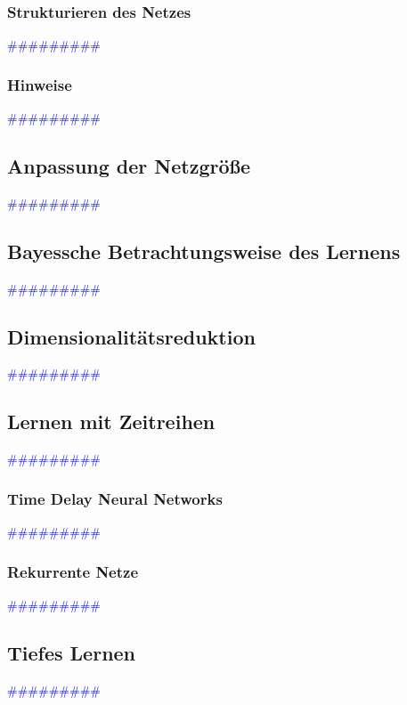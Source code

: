 \documentclass{article}
\begin{document}
    \subsubsection{Strukturieren des Netzes} %
      \textcolor{blue}{\#\#\#\#\#\#\#\#\#}
    \subsubsection{Hinweise} %
      \textcolor{blue}{\#\#\#\#\#\#\#\#\#}
  \subsection{Anpassung der Netzgröße} %
      \textcolor{blue}{\#\#\#\#\#\#\#\#\#}
  \subsection{Bayessche Betrachtungsweise des Lernens} %
      \textcolor{blue}{\#\#\#\#\#\#\#\#\#}
  \subsection{Dimensionalitätsreduktion} %
      \textcolor{blue}{\#\#\#\#\#\#\#\#\#}
  \subsection{Lernen mit Zeitreihen} %
      \textcolor{blue}{\#\#\#\#\#\#\#\#\#}
    \subsubsection{Time Delay Neural Networks} %
      \textcolor{blue}{\#\#\#\#\#\#\#\#\#}
    \subsubsection{Rekurrente Netze} %
      \textcolor{blue}{\#\#\#\#\#\#\#\#\#}
  \subsection{Tiefes Lernen} %
      \textcolor{blue}{\#\#\#\#\#\#\#\#\#}
\end{document}

